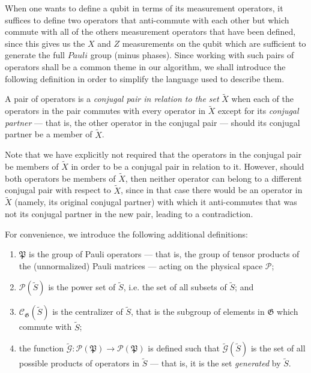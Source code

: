 \documentclass[twocolumn,showpacs,preprintnumbers,amsmath,amssymb,nofootinbib,pra,floatfix]{revtex4-1}
\newenvironment{definition}[1][Definition]{\begin{trivlist}
\item[\hskip \labelsep {\bfseries #1}]}{\end{trivlist}}
\newcommand{\set}{\tilde}
\newcommand{\genfun}{\tilde{\mathcal{G}}}
\newcommand{\pauligroup}{\mathfrak{P}}
\newcommand{\powerset}{\mathcal{P}}
\newcommand{\centralizer}{\mathcal{C}}
\begin{document}
When one wants to define a qubit in terms of its measurement operators, it suffices to define two operators that anti-commute with each other but which commute with all of the others measurement operators that have been defined, since this gives us the $X$ and $Z$ measurements on the qubit which are sufficient to generate the full $Pauli$ group (minus phases).  Since working with such pairs of operators shall be a common theme in our algorithm, we shall introduce the following definition in order to simplify the language used to describe them.

\begin{definition} A pair of operators is a \emph{conjugal pair in relation to the set} $\set X$ when each of the operators in the pair commutes with every operator in $\set X$ except for its \emph{conjugal partner} --- that is, the other operator in the conjugal pair --- should its conjugal partner be a member of $\set X$.
\label{conjugal-pair-definition}
\end{definition}

Note that we have explicitly not required that the operators in the conjugal pair be members of $\set X$ in order to be a conjugal pair in relation to it.  However, should both operators be members of $\set X$, then neither operator can belong to a different conjugal pair with respect to $\set X$, since in that case there would be an operator in $\set X$ (namely, its original conjugal partner) with which it anti-commutes that was not its conjugal partner in the new pair, leading to a contradiction.

For convenience, we introduce the following additional definitions:

\begin{definition}

\begin{enumerate}
\item $\pauligroup$ is the group of Pauli operators --- that is, the group of tensor products of the (unnormalized) Pauli matrices --- acting on the physical space $\mathscr{P}$;
\item $\powerset(\set S)$ is the power set of $\set S$, i.e. the set of all subsets of $\set S$; and
\item $\centralizer_\mathfrak{G}(\set S)$ is the centralizer of $\set S$, that is the subgroup of elements in $\mathfrak{G}$ which commute with $\set S$;
\item the function $\genfun:\powerset(\pauligroup)\to\powerset(\pauligroup)$ is defined such that $\genfun(\set S)$ is the set of all possible products of operators in $\set S$ --- that is, it is the set \emph{generated} by $\set S$.
\end{enumerate}

\end{definition}
\end{document}
